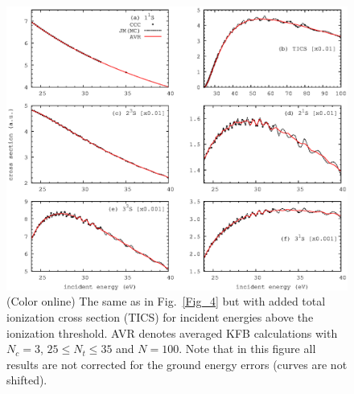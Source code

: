 \documentclass[aip
, pra
, showpacs
, aps
, twocolumn
, groupedaddress
, floatfix
]{revtex4}
\begin{document}
\begin{figure}[htb]
\includegraphics[scale=1]{fig5.ps}
\caption{(Color online)
The same as in Fig.~\ref{Fig_4} but with added total ionization cross section (TICS)
for incident energies above the ionization threshold.
AVR denotes averaged KFB calculations with $N_c=3$, $25\leq N_t \le 35$ and $N=100$.
Note that in this figure all results are not corrected for the ground energy errors (curves are not shifted).
}
\label{Fig_5}
\end{figure}
\end{document}
